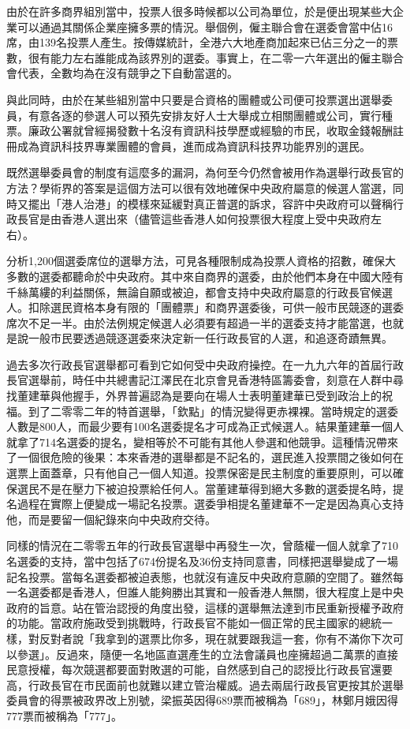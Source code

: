 由於在許多商界組別當中，投票人很多時候都以公司為單位，於是便出現某些大企業可以通過其關係企業座擁多票的情況。舉個例，僱主聯合會在選委會當中佔16席，由139名投票人產生。按傳媒統計，全港六大地產商加起來已佔三分之一的票數，很有能力左右誰能成為該界別的選委。事實上，在二零一六年選出的僱主聯合會代表，全數均為在沒有競爭之下自動當選的。

與此同時，由於在某些組別當中只要是合資格的團體或公司便可投票選出選舉委員，有意各逐的參選人可以預先安排友好人士大舉成立相關團體或公司，實行種票。廉政公署就曾經揭發數十名沒有資訊科技學歷或經驗的市民，收取金錢報酬註冊成為資訊科技界專業團體的會員，進而成為資訊科技界功能界別的選民。

既然選舉委員會的制度有這麼多的漏洞，為何至今仍然會被用作為選舉行政長官的方法？學術界的答案是這個方法可以很有效地確保中央政府屬意的候選人當選，同時又擺出「港人治港」的模樣來延緩對真正普選的訴求，容許中央政府可以聲稱行政長官是由香港人選出來（儘管這些香港人如何投票很大程度上受中央政府左右）。

分析1,200個選委席位的選舉方法，可見各種限制成為投票人資格的招數，確保大多數的選委都聽命於中央政府。其中來自商界的選委，由於他們本身在中國大陸有千絲萬縷的利益關係，無論自願或被迫，都會支持中央政府屬意的行政長官候選人。扣除選民資格本身有限的「團體票」和商界選委後，可供一般市民競逐的選委席次不足一半。由於法例規定候選人必須要有超過一半的選委支持才能當選，也就是說一般市民要透過競逐選委來決定新一任行政長官的人選，和追逐奇蹟無異。

過去多次行政長官選舉都可看到它如何受中央政府操控。在一九九六年的首屆行政長官選舉前，時任中共總書記江澤民在北京會見香港特區籌委會，刻意在人群中尋找董建華與他握手，外界普遍認為是要向在場人士表明董建華已受到政治上的祝福。到了二零零二年的特首選舉，「欽點」的情況變得更赤裸裸。當時規定的選委人數是800人，而最少要有100名選委提名才可成為正式候選人。結果董建華一個人就拿了714名選委的提名，變相等於不可能有其他人參選和他競爭。這種情況帶來了一個很危險的後果：本來香港的選舉都是不記名的，選民進入投票間之後如何在選票上面蓋章，只有他自己一個人知道。投票保密是民主制度的重要原則，可以確保選民不是在壓力下被迫投票給任何人。當董建華得到絕大多數的選委提名時，提名過程在實際上便變成一場記名投票。選委爭相提名董建華不一定是因為真心支持他，而是要留一個紀錄來向中央政府交待。

同樣的情況在二零零五年的行政長官選舉中再發生一次，曾蔭權一個人就拿了710名選委的支持，當中包括了674份提名及36份支持同意書，同樣把選舉變成了一場記名投票。當每名選委都被迫表態，也就沒有違反中央政府意願的空間了。雖然每一名選委都是香港人，但誰人能夠勝出其實和一般香港人無關，很大程度上是中央政府的旨意。站在管治認授的角度出發，這樣的選舉無法達到市民重新授權予政府的功能。當政府施政受到挑戰時，行政長官不能如一個正常的民主國家的總統一樣，對反對者說「我拿到的選票比你多，現在就要跟我這一套，你有不滿你下次可以參選」。反過來，隨便一名地區直選產生的立法會議員也座擁超過二萬票的直接民意授權，每次競選都要面對敗選的可能，自然感到自己的認授比行政長官還要高，行政長官在市民面前也就難以建立管治權威。過去兩屆行政長官更按其於選舉委員會的得票被政界改上別號，梁振英因得689票而被稱為「689」，林鄭月娥因得777票而被稱為「777」。

